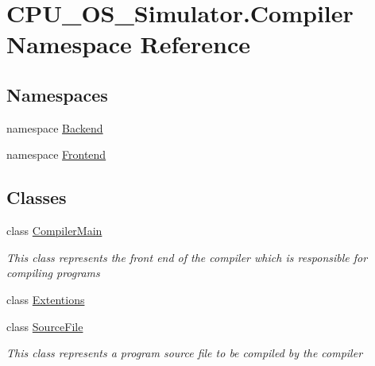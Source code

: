 \hypertarget{namespace_c_p_u___o_s___simulator_1_1_compiler}{}\section{C\+P\+U\+\_\+\+O\+S\+\_\+\+Simulator.\+Compiler Namespace Reference}
\label{namespace_c_p_u___o_s___simulator_1_1_compiler}
\subsection*{Namespaces}
\begin{DoxyCompactItemize}
\item 
namespace \hyperlink{namespace_c_p_u___o_s___simulator_1_1_compiler_1_1_backend}{Backend}
\item 
namespace \hyperlink{namespace_c_p_u___o_s___simulator_1_1_compiler_1_1_frontend}{Frontend}
\end{DoxyCompactItemize}
\subsection*{Classes}
\begin{DoxyCompactItemize}
\item 
class \hyperlink{class_c_p_u___o_s___simulator_1_1_compiler_1_1_compiler_main}{Compiler\+Main}
\begin{DoxyCompactList}\small\item\em This class represents the front end of the compiler which is responsible for compiling programs \end{DoxyCompactList}\item 
class \hyperlink{class_c_p_u___o_s___simulator_1_1_compiler_1_1_extentions}{Extentions}
\item 
class \hyperlink{class_c_p_u___o_s___simulator_1_1_compiler_1_1_source_file}{Source\+File}
\begin{DoxyCompactList}\small\item\em This class represents a program source file to be compiled by the compiler \end{DoxyCompactList}\end{DoxyCompactItemize}
